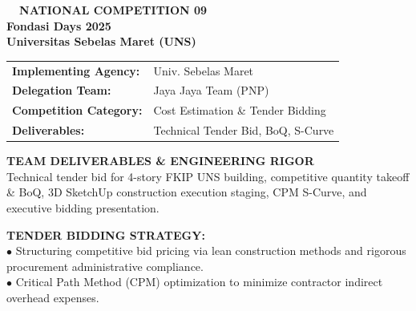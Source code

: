 \documentclass[10pt,a4paper,landscape]{article}
\begin{document}
\noindent
\begin{minipage}[t]{0.30\linewidth}
  \vspace{0pt}
  \begin{tcolorbox}[sharp corners, boxrule=0.8pt, colframe=pborder, colback=white, left=3mm, right=3mm, top=2.5mm, bottom=2.5mm, height=100mm]
    \colorbox{pred}{\fontsize{7pt}{8pt}\selectfont\bfseries\color{white}\ \ NATIONAL COMPETITION 09\ \ }\\[1.5mm]
    {\fontsize{9.5pt}{11.5pt}\selectfont\bfseries\color{pnavy}Fondasi Days 2025}\\[0.5mm]
    {\fontsize{7pt}{8.5pt}\selectfont\bfseries\color{pred}Universitas Sebelas Maret (UNS)}\\[2mm]

    \begin{tcolorbox}[sharp corners, boxrule=0.5pt, colframe=pborder, colback=pbglight, left=2mm, right=2mm, top=1.5mm, bottom=1.5mm]
      \begin{tabularx}{\linewidth}{@{}p{22mm} X@{}}
        {\fontsize{6.8pt}{8pt}\selectfont\bfseries Implementing Agency:} & {\fontsize{6.8pt}{8pt}\selectfont Univ. Sebelas Maret} \\[0.8mm]
        {\fontsize{6.8pt}{8pt}\selectfont\bfseries Delegation Team:} & {\fontsize{6.8pt}{8pt}\selectfont Jaya Jaya Team (PNP)} \\[0.8mm]
        {\fontsize{6.8pt}{8pt}\selectfont\bfseries Competition Category:} & {\fontsize{6.8pt}{8pt}\selectfont Cost Estimation \& Tender Bidding} \\[0.8mm]
        {\fontsize{6.8pt}{8pt}\selectfont\bfseries Deliverables:} & {\fontsize{6.8pt}{8pt}\selectfont Technical Tender Bid, BoQ, S-Curve}
      \end{tabularx}
    \end{tcolorbox}
    \vspace{1.5mm}

    {\fontsize{7.5pt}{9pt}\selectfont\bfseries\color{pnavy}TEAM DELIVERABLES \& ENGINEERING RIGOR}\\[0.8mm]
    {\fontsize{6.5pt}{8.2pt}\selectfont\color{psteel}
    Technical tender bid for 4-story FKIP UNS building, competitive quantity takeoff \& BoQ, 3D SketchUp construction execution staging, CPM S-Curve, and executive bidding presentation.
    }
  \end{tcolorbox}
  \vspace{2mm}

  \begin{tcolorbox}[sharp corners, boxrule=0.6pt, colframe=pnavy, colback=pbglight, left=2.5mm, right=2.5mm, top=2mm, bottom=2mm, height=52mm]
    {\fontsize{7pt}{8.5pt}\selectfont\bfseries\color{pnavy}TENDER BIDDING STRATEGY:}\\[1.5mm]
    {\fontsize{6.5pt}{8.2pt}\selectfont\color{psteel}
    $\bullet$ Structuring competitive bid pricing via lean construction methods and rigorous procurement administrative compliance.\\
    $\bullet$ Critical Path Method (CPM) optimization to minimize contractor indirect overhead expenses.
    }
  \end{tcolorbox}
\end{minipage}%
\end{document}
